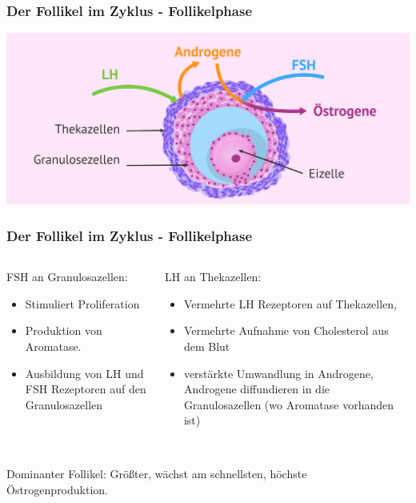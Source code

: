 \documentclass{beamer}
\begin{document}

\begin{frame}
\frametitle{ Der Follikel im Zyklus - Follikelphase}

\begin{center}
\includegraphics[width=\textwidth]{Follikel_FSH_LH.png}
\end{center}

\end{frame}


\begin{frame}
\frametitle{ Der Follikel im Zyklus - Follikelphase}

\begin{columns}[c]
\begin{column}{5cm}
FSH an Granulosazellen:
\begin{itemize}
\item
Stimuliert Proliferation 
\item 
Produktion von Aromatase. 
\item
Ausbildung von LH und FSH Rezeptoren auf den Granulosazellen
\end{itemize}

\end{column}

\begin{column}{5cm}
LH an Thekazellen:
\begin{itemize}
\item
Vermehrte LH Rezeptoren auf Thekazellen, 
\item 
Vermehrte Aufnahme von Cholesterol aus dem Blut
\item
verstärkte Umwandlung in Androgene, Androgene diffundieren in die Granulosazellen (wo Aromatase vorhanden ist)
\end {itemize}
\end{column}


\end{columns}

$\,$\\[0.5 cm]


Dominanter Follikel: Größter, wächst am schnellsten, höchste Östrogenproduktion.


\end{frame}
\end{document}
